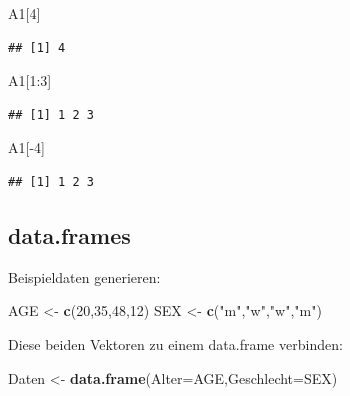\documentclass[]{article}
\newenvironment{Shaded}{\begin{snugshade}}{\end{snugshade}}
\newcommand{\KeywordTok}[1]{\textcolor[rgb]{0.13,0.29,0.53}{\textbf{{#1}}}}
\newcommand{\DataTypeTok}[1]{\textcolor[rgb]{0.13,0.29,0.53}{{#1}}}
\newcommand{\DecValTok}[1]{\textcolor[rgb]{0.00,0.00,0.81}{{#1}}}
\newcommand{\StringTok}[1]{\textcolor[rgb]{0.31,0.60,0.02}{{#1}}}
\newcommand{\NormalTok}[1]{{#1}}
\begin{document}
\begin{Shaded}
\begin{Highlighting}[]
\NormalTok{A1[}\DecValTok{4}\NormalTok{]}
\end{Highlighting}
\end{Shaded}

\begin{verbatim}
## [1] 4
\end{verbatim}

\begin{Shaded}
\begin{Highlighting}[]
\NormalTok{A1[}\DecValTok{1}\NormalTok{:}\DecValTok{3}\NormalTok{]}
\end{Highlighting}
\end{Shaded}

\begin{verbatim}
## [1] 1 2 3
\end{verbatim}

\begin{Shaded}
\begin{Highlighting}[]
\NormalTok{A1[-}\DecValTok{4}\NormalTok{]}
\end{Highlighting}
\end{Shaded}

\begin{verbatim}
## [1] 1 2 3
\end{verbatim}

\subsection{data.frames}\label{data.frames}

Beispieldaten generieren:

\begin{Shaded}
\begin{Highlighting}[]
\NormalTok{AGE <-}\StringTok{ }\KeywordTok{c}\NormalTok{(}\DecValTok{20}\NormalTok{,}\DecValTok{35}\NormalTok{,}\DecValTok{48}\NormalTok{,}\DecValTok{12}\NormalTok{)}
\NormalTok{SEX <-}\StringTok{ }\KeywordTok{c}\NormalTok{(}\StringTok{"m"}\NormalTok{,}\StringTok{"w"}\NormalTok{,}\StringTok{"w"}\NormalTok{,}\StringTok{"m"}\NormalTok{)}
\end{Highlighting}
\end{Shaded}

Diese beiden Vektoren zu einem data.frame verbinden:

\begin{Shaded}
\begin{Highlighting}[]
\NormalTok{Daten <-}\StringTok{ }\KeywordTok{data.frame}\NormalTok{(}\DataTypeTok{Alter=}\NormalTok{AGE,}\DataTypeTok{Geschlecht=}\NormalTok{SEX)}
\end{Highlighting}
\end{Shaded}
\end{document}
